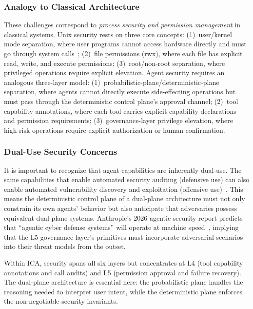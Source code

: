 \subsubsection{Analogy to Classical Architecture}
These challenges correspond to \emph{process security and permission management} in classical systems.
Unix security rests on three core concepts: (1)~user/kernel mode separation, where user programs cannot access hardware directly and must go through system calls~\cite{ostep_2023}; (2)~file permissions (rwx), where each file has explicit read, write, and execute permissions; (3)~root/non-root separation, where privileged operations require explicit elevation.
Agent security requires an analogous three-layer model: (1)~probabilistic-plane/deterministic-plane separation, where agents cannot directly execute side-effecting operations but must pass through the deterministic control plane's approval channel; (2)~tool capability annotations, where each tool carries explicit capability declarations and permission requirements; (3)~governance-layer privilege elevation, where high-risk operations require explicit authorization or human confirmation.

\subsubsection{Dual-Use Security Concerns}
It is important to recognize that agent capabilities are inherently dual-use.
The same capabilities that enable automated security auditing (defensive use) can also enable automated vulnerability discovery and exploitation (offensive use)~\cite{anthropic2026agenticreport}.
This means the deterministic control plane of a dual-plane architecture must not only constrain its own agents' behavior but also anticipate that adversaries possess equivalent dual-plane systems.
Anthropic's 2026 agentic security report predicts that ``agentic cyber defense systems'' will operate at machine speed~\cite{anthropic2026agenticreport}, implying that the L5 governance layer's primitives must incorporate adversarial scenarios into their threat models from the outset.

Within ICA, security spans all six layers but concentrates at L4 (tool capability annotations and call audits) and L5 (permission approval and failure recovery).
The dual-plane architecture is essential here: the probabilistic plane handles the reasoning needed to interpret user intent, while the deterministic plane enforces the non-negotiable security invariants.

